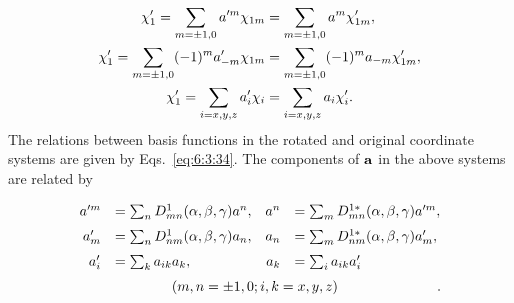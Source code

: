 \begin{align}
\chi_{1}^{\prime}=\sum_{m= \pm 1,0} a^{\prime m} \chi_{1 m} & =\sum_{m= \pm 1,0} a^{m} \chi_{1 m}^{\prime}, \notag\\
\chi_{1}^{\prime}=\sum_{m= \pm 1,0}(-1)^{m} a_{-m}^{\prime} \chi_{1 m} & =\sum_{m= \pm 1,0}(-1)^{m} a_{-m} \chi_{1 m}^{\prime}, \label{eq:6:3:78}\\
\chi_{1}^{\prime}=\sum_{i=x, y, z} a_{i}^{\prime} \chi_{i} & =\sum_{i=x, y, z} a_{i} \chi_{i}^{\prime} . \notag
\end{align}
The relations between basis functions in the rotated and original coordinate systems are given by Eqs.~\eqref{eq:6:3:34}. The components of $\mathbf{a}$ in the above systems are related by
\begin{equation}
    \renewcommand{\arraystretch}{1.5}
\begin{array}{rlrl}
a^{\prime m} & =\sum_{n} D_{m n}^{1}(\alpha, \beta, \gamma) a^{n}, & a^{n} & =\sum_{m} D_{m n}^{1 *}(\alpha, \beta, \gamma) a^{\prime m}, \\
a_{m}^{\prime} & =\sum_{n} D_{n m}^{1}(\alpha, \beta, \gamma) a_{n}, & a_{n} & =\sum_{m} D_{n m}^{1 *}(\alpha, \beta, \gamma) a_{m}^{\prime}, \\
a_{i}^{\prime} & =\sum_{k} a_{i k} a_{k}, & a_{k} & =\sum_{i} a_{i k} a_{i}^{\prime} \\
\multicolumn{4}{c}{(m, n= \pm 1,0 ;  i, k  =x, y, z)}.
\end{array}  \label{eq:6:3:79}
\end{equation}